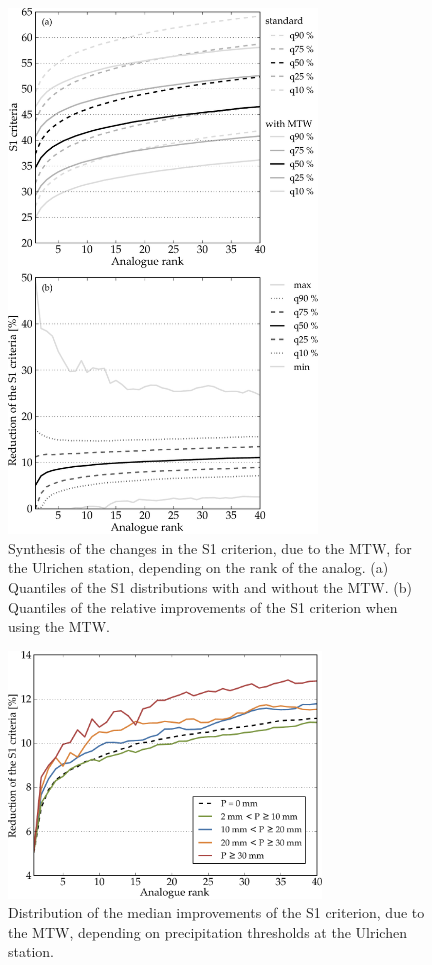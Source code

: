 \documentclass[hess, manuscript]{copernicus}
\begin{document}
\begin{figure}[htb]
	\begin{center}
		\includegraphics[width=8.2cm]{figures/changes_S1_value_and_gain.pdf}
	\end{center}
	\caption{Synthesis of the changes in the S1 criterion, due to the MTW, for the Ulrichen station, depending on the rank of the analog. (a) Quantiles of the S1 distributions with and without the MTW. (b) Quantiles of the relative improvements of the S1 criterion when using the MTW.}
	\label{fig:changes_S1}
\end{figure}

\begin{figure}[htb]
	\begin{center}
		\includegraphics[width=8.3cm]{figures/changes_S1_precip_threshold.pdf}
	\end{center}
	\caption{Distribution of the median improvements of the S1 criterion, due to the MTW, depending on precipitation thresholds at the Ulrichen station.}
	\label{fig:changes_S1_precip_threshold}
\end{figure}
\end{document}

